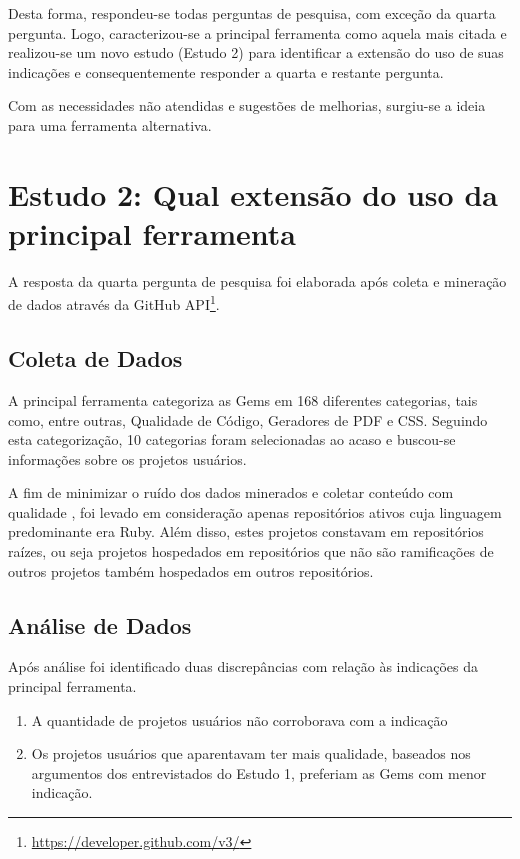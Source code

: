 Desta forma, respondeu-se todas perguntas de pesquisa, com exceção da quarta pergunta. Logo, caracterizou-se a principal ferramenta como aquela mais citada e realizou-se um novo estudo (Estudo 2) para identificar a extensão do uso de suas indicações e consequentemente responder a quarta e restante pergunta.

Com as necessidades não atendidas e sugestões de melhorias, surgiu-se a ideia para uma ferramenta alternativa.

\section{Estudo 2: Qual extensão do uso da principal ferramenta}

A resposta da quarta pergunta de pesquisa foi elaborada após coleta e mineração de dados através da GitHub API\footnote{\url{https://developer.github.com/v3/}}. 

\subsection{Coleta de Dados}

A principal ferramenta categoriza as Gems em 168 diferentes categorias, tais como, entre outras, Qualidade de Código, Geradores de PDF e CSS. Seguindo esta categorização, 10 categorias foram selecionadas ao acaso e buscou-se informações sobre os projetos usuários.

A fim de minimizar o ruído dos dados minerados e coletar conteúdo com qualidade \cite{Kalliamvakou:2014:PPM:2597073.2597074}, foi levado em consideração apenas repositórios ativos cuja linguagem predominante era Ruby. Além disso, estes projetos constavam em repositórios raízes, ou seja projetos hospedados em repositórios que não são ramificações de outros projetos também hospedados em outros repositórios.

\subsection{Análise de Dados}

Após análise foi identificado duas discrepâncias com relação às indicações da principal ferramenta.

\begin{enumerate}
	\item A quantidade de projetos usuários não corroborava com a indicação
    \item Os projetos usuários que aparentavam ter mais qualidade, baseados nos argumentos dos entrevistados do Estudo 1, preferiam as Gems com menor indicação.
\end{enumerate}

